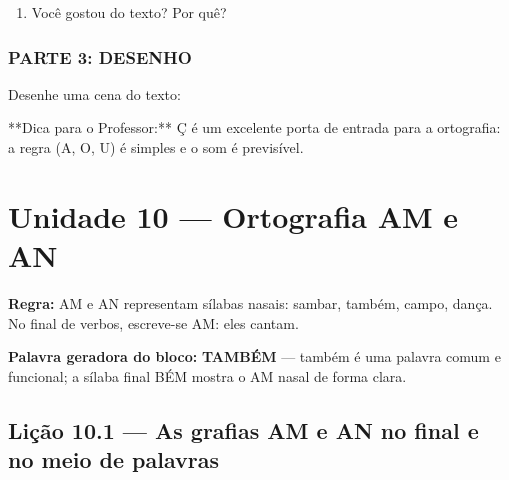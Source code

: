\begin{exercicio}
\begin{enumerate}
  \item Você gostou do texto? Por quê?
  \begin{center}
  \underline{\hspace{12cm}}
  \end{center}

\end{enumerate}

\subsection*{PARTE 3: DESENHO}

Desenhe uma cena do texto:

\begin{center}
\end{center}

\end{exercicio}

\begin{dica}
**Dica para o Professor:** Ç é um excelente porta de entrada para a ortografia: a regra (A, O, U) é simples e o som é previsível.
\end{dica}



\chapter{Unidade 10 --- Ortografia AM e AN}


\textbf{Regra:} AM e AN representam sílabas nasais: sambar, também, campo, dança. No final de verbos, escreve-se AM: eles cantam.

\textbf{Palavra geradora do bloco:} \textbf{TAMBÉM} --- também é uma palavra comum e funcional; a sílaba final BÉM mostra o AM nasal de forma clara.

\section{Lição 10.1 --- As grafias AM e AN no final e no meio de palavras}

